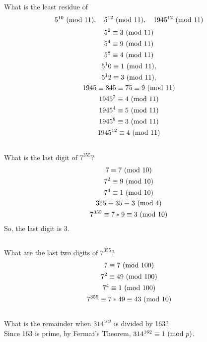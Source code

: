 \documentclass{article}
\begin{document}
\subsection{}
What is the least residue of
\begin{equation*}
    5^{10} \ (\mathrm{mod}\ 11), \quad 5^{12} \ (\mathrm{mod}\ 11), \quad 1945^{12} \ (\mathrm{mod}\ 11)
\end{equation*}
\begin{gather*}
    5^2 \equiv 3 \ (\mathrm{mod}\ 11)\\
    5^4 \equiv 9 \ (\mathrm{mod}\ 11)\\
    5^8 \equiv 4 \ (\mathrm{mod}\ 11)\\
    5^10 \equiv 1 \ (\mathrm{mod}\ 11),\\
    5^12 \equiv 3 \ (\mathrm{mod}\ 11),\\
    1945 \equiv 845 \equiv 75 \equiv 9 \ (\mathrm{mod}\ 11)\\
    1945^2 \equiv 4 \ (\mathrm{mod}\ 11)\\
    1945^4 \equiv 5 \ (\mathrm{mod}\ 11)\\
    1945^8 \equiv 3 \ (\mathrm{mod}\ 11)\\
    1945^{12} \equiv 4 \ (\mathrm{mod}\ 11)
\end{gather*}

\subsection{}
What is the last digit of $7^{355}$?
\begin{gather*}
    7 \equiv 7 \ (\mathrm{mod}\ 10)\\
    7^2 \equiv 9 \ (\mathrm{mod}\ 10)\\
    7^4 \equiv 1 \ (\mathrm{mod}\ 10)\\
    355 \equiv 35 \equiv 3 \ (\mathrm{mod}\ 4)\\
    7^{355} \equiv 7 * 9 \equiv 3 \ (\mathrm{mod}\ 10)
\end{gather*}
So, the last digit is 3.

\subsection{}
What are the last two digits of $7^{355}$?
\begin{gather*}
    7 \equiv 7 \ (\mathrm{mod}\ 100)\\
    7^2 \equiv 49 \ (\mathrm{mod}\ 100)\\
    7^4 \equiv 1 \ (\mathrm{mod}\ 100)\\
    7^{355} \equiv 7 * 49 \equiv 43 \ (\mathrm{mod}\ 10)
\end{gather*}

\subsection{}
What is the remainder when $314^{162}$ is divided by 163?\\
Since 163 is prime, by Fermat's Theorem, $314^{162} \equiv 1 \ (\mathrm{mod}\ p)$.
\end{document}
